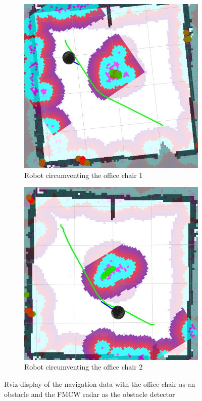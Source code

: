 \begin{figure}[ht!]
  \centering
  \begin{subfigure}[t]{0.49\linewidth}
    \includegraphics[width=\linewidth]{imgs/chapter5/rvizwchairradar1.png}
     \caption{Robot circumventing the office chair 1}
     \label{fig::rvizwchairradar1}
  \end{subfigure}
  \begin{subfigure}[t]{0.47\linewidth}
    \includegraphics[width=\linewidth]{imgs/chapter5/rvizwchairradar2.png}
    \caption{Robot circumventing the office chair 2}
    \label{fig::rvizwchairradar2}
  \end{subfigure}
  \caption[Navigation data with the office chair as an obstacle with \ac{FMCW} \ac{radar}]{Rviz display of the navigation data with the office chair as an obstacle and the  \ac{FMCW} \ac{radar} as the obstacle detector}
  \label{fig::rvizwchairradar}
\end{figure}
